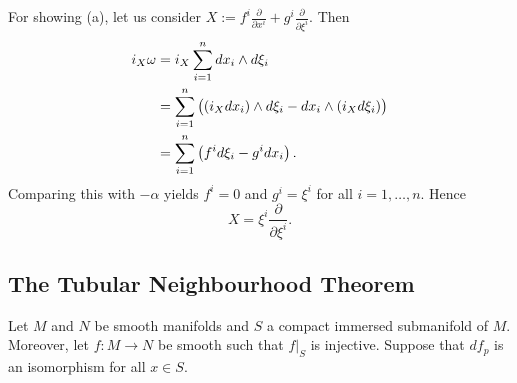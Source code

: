\begin{solution}
	For showing (a), let us consider $X := f^i \frac{\partial}{\partial x^i} + g^i \frac{\partial}{\partial \xi^i}$. Then
	\begin{align*}
		i_X\omega &= i_X\sum_{i = 1}^n dx_i \wedge d\xi_i\\
		&= \sum_{i = 1}^n \del[1]{(i_Xdx_i) \wedge d\xi_i - dx_i \wedge (i_X d\xi_i)}\\
		&= \sum_{i = 1}^n \del[1]{f^i d\xi_i - g^i dx_i}. 
	\end{align*}
	Comparing this with $-\alpha$ yields $f^i = 0$ and $g^i = \xi^i$ for all $i = 1,\dots,n$. Hence
	\begin{equation*}
		X = \xi^i \frac{\partial}{\partial \xi^i}.
	\end{equation*}
\end{solution}

\appendix
\begin{appendix}
	\section{The Tubular Neighbourhood Theorem}
	\begin{theorem}
		Let $M$ and $N$ be smooth manifolds and $S$ a compact immersed submanifold of $M$. Moreover, let $f : M \to N$ be smooth such that $f\vert_S$ is injective. Suppose that $df_p$ is an isomorphism for all $x \in S$.
	\end{theorem}
\end{appendix}


